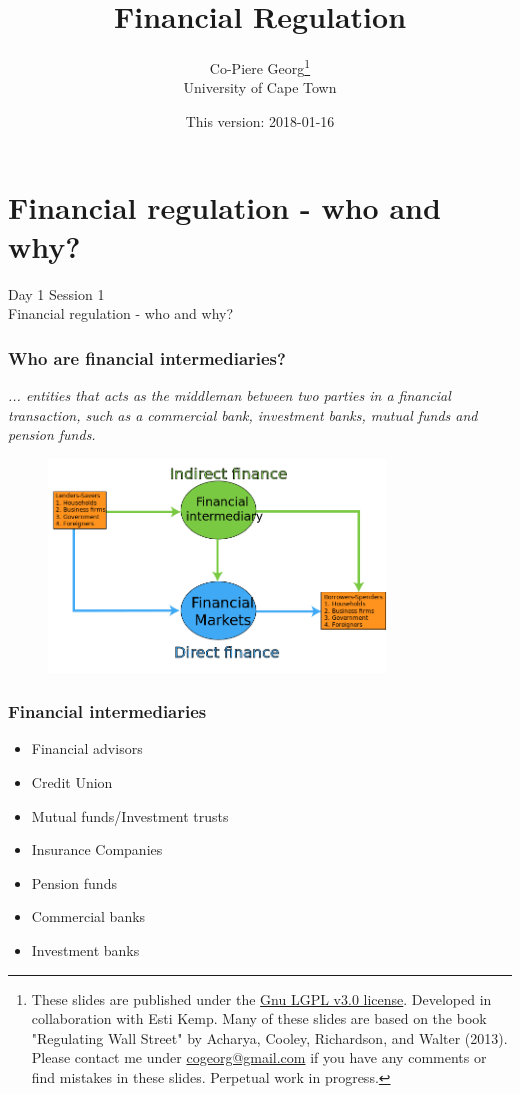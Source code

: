 \documentclass[11pt]{beamer}
\title
{Financial Regulation}
\author[Co-Pierre Georg]
{
Co-Piere Georg\footnote{These slides are published under the \href{https://www.gnu.org/licenses/lgpl-3.0.en.html}{Gnu LGPL v3.0 license}. Developed in collaboration with Esti Kemp. Many of these slides are based on the book "Regulating Wall Street" by Acharya, Cooley, Richardson, and Walter (2013). Please contact me under \url{cogeorg@gmail.com} if you have any comments or find mistakes in these slides. Perpetual work in progress.}\\
University of Cape Town
}
\date
{This version: 2018-01-16}
\begin{document}
%

\begin{frame}
  \titlepage
\end{frame}



%
\section{Financial regulation - who and why?}\label{Sec:Day 1 session 1}
%
\begin{frame}
\begin{center}
 Day 1 Session 1 \\
 Financial regulation - who and why?
\end{center}
\end{frame}

\begin{frame}
\frametitle{Who are financial intermediaries?}
\textit{... entities that acts as the middleman between two parties in a financial transaction, such as a commercial bank, investment banks, mutual funds and pension funds.}

\begin{figure}[h]
		 \includegraphics[width=0.8\textwidth]{FIs1.png}
	\end{figure}
\end{frame}
\begin{frame}
\frametitle{Financial intermediaries}
\hfill \break
\begin{itemize}
\item  Financial advisors
\item  Credit Union
\item Mutual funds/Investment trusts
\item  Insurance Companies
\item Pension funds
\item Commercial banks
\item Investment banks
\end{itemize}

\end{frame}
\end{document}

